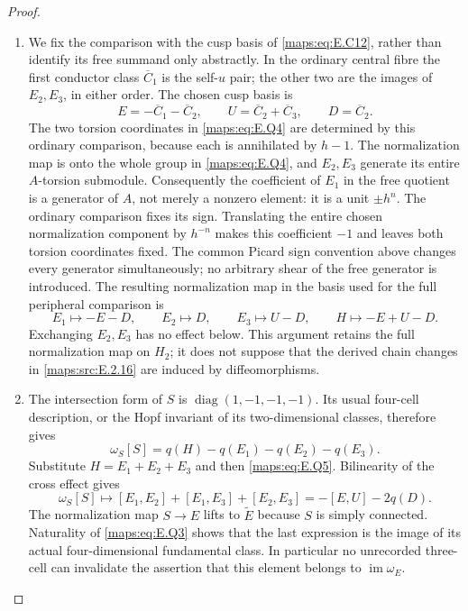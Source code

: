 \begin{proof}
\begin{enumerate}[label=\arabic*.,leftmargin=*]
\item We fix the comparison with the cusp basis of \eqref{maps:eq:E.C12}, rather
than identify its free summand only abstractly.  In the ordinary
central fibre the first conductor class $\overline C_1$ is the
self-$u$ pair; the other two are the images of $E_2,E_3$,
in either order.  The chosen cusp basis is
\[
 E=-\overline C_1-\overline C_2,\qquad
 U=\overline C_2+\overline C_3,\qquad D=\overline C_2.
\]
The two torsion coordinates in \eqref{maps:eq:E.Q4} are determined by
this ordinary comparison, because each is annihilated by
$h-1$.  The normalization map is onto the whole group in
\eqref{maps:eq:E.Q4}, and $E_2,E_3$ generate its entire $A$-torsion
submodule.  Consequently the coefficient of $E_1$ in the
free quotient is a generator of $A$, not merely a nonzero
element: it is a unit $\pm h^n$.  The ordinary comparison
fixes its sign.  Translating the entire chosen normalization
component by $h^{-n}$ makes this coefficient $-1$ and leaves
both torsion coordinates fixed.  The common Picard sign
convention above changes every generator simultaneously;
no arbitrary shear of the free generator is introduced.
The resulting
normalization map in the basis used for the full peripheral
comparison is
\[
 E_1\longmapsto-E-D,\qquad
 E_2\longmapsto D,\qquad E_3\longmapsto U-D,
 \qquad H\longmapsto-E+U-D.
 \tag{E.Q5}\label{maps:eq:E.Q5}
\]
Exchanging $E_2,E_3$ has no effect below.  This argument
retains the full normalization map on $H_2$; it does not
suppose that the derived chain changes in \ref{maps:src:E.2.16} are induced
by diffeomorphisms.

\item The intersection form of $S$ is
$\operatorname{diag}(1,-1,-1,-1)$.  Its usual four-cell
description, or the Hopf invariant of its two-dimensional
classes, therefore gives
\[
 \omega_S[S]=q(H)-q(E_1)-q(E_2)-q(E_3).
\]
Substitute $H=E_1+E_2+E_3$ and then \eqref{maps:eq:E.Q5}.  Bilinearity
of the cross effect gives
\[
 \omega_S[S]\longmapsto
 [E_1,E_2]+[E_1,E_3]+[E_2,E_3]
                      =-[E,U]-2q(D).
 \tag{E.Q6}\label{maps:eq:E.Q6}
\]
The normalization map $S\to E$ lifts to $\widetilde E$
because $S$ is simply connected.  Naturality of \eqref{maps:eq:E.Q3}
shows that the last expression is the image of its actual
four-dimensional fundamental class.  In particular no
unrecorded three-cell can invalidate the assertion that
this element belongs to $\operatorname{im}\omega_E$.


\end{enumerate}
\end{proof}
